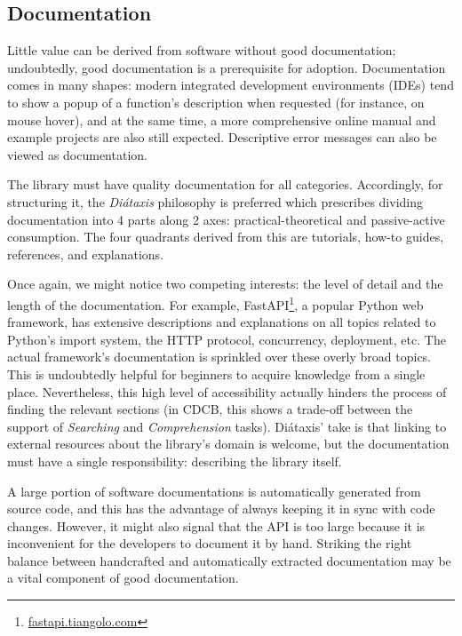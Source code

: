 \subsection{Documentation}

Little value can be derived from software without good documentation; undoubtedly, good documentation is a prerequisite for adoption. Documentation comes in many shapes: modern integrated development environments (IDEs) tend to show a popup of a function's description when requested (for instance, on mouse hover), and at the same time, a more comprehensive online manual and example projects are also still expected. Descriptive error messages can also be viewed as documentation. 

The library must have quality documentation for all categories. Accordingly, for structuring it, the \textit{Diátaxis} philosophy is preferred \cite{Procida_Diataxis_documentation_framework} which prescribes dividing documentation into 4 parts along 2 axes: practical-theoretical and passive-active consumption. The four quadrants derived from this are tutorials, how-to guides, references, and explanations.

Once again, we might notice two competing interests: the level of detail and the length of the documentation. For example, FastAPI\footnote{\href{https://fastapi.tiangolo.com/async/\#concurrent-burgers}{fastapi.tiangolo.com}}, a popular Python web framework, has extensive descriptions and explanations on all topics related to Python's import system, the HTTP protocol, concurrency, deployment, etc. The actual framework's documentation is sprinkled over these overly broad topics. This is undoubtedly helpful for beginners to acquire knowledge from a single place. Nevertheless, this high level of accessibility actually hinders the process of finding the relevant sections (in CDCB, this shows a trade-off between the support of \textit{Searching} and \textit{Comprehension} tasks). Diátaxis' take is that linking to external resources about the library's domain is welcome, but the documentation must have a single responsibility: describing the library itself.

A large portion of software documentations is automatically generated from source code, and this has the advantage of always keeping it in sync with code changes. However, it might also signal that the API is too large because it is inconvenient for the developers to document it by hand. Striking the right balance between handcrafted and automatically extracted documentation may be a vital component of good documentation.

